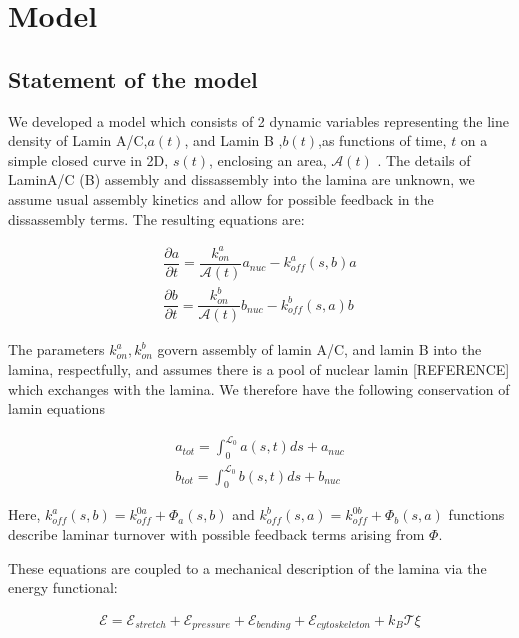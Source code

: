 \section{Model}

\subsection{Statement of the model} We developed a model which consists of 2 dynamic variables representing the line density of Lamin A/C,$a(t)$, and Lamin B ,$b(t)$,as functions of time, $t$ on a simple closed curve in 2D, $s(t)$, enclosing an area, $\mathcal{A}(t)$ . The details of LaminA/C (B)  assembly and dissassembly into the lamina are unknown, we assume usual assembly kinetics and allow for possible feedback in the dissassembly terms. The resulting equations are:

\begin{align}
\dfrac{\partial a}{\partial t} = \dfrac{k_{on}^a}{\mathcal{A}(t)} a_{nuc} - k_{off}^a (s,b)a\\[7pt]
\dfrac{\partial b}{\partial t} = \dfrac{k_{on}^b}{\mathcal{A}(t)}b_{nuc} - k_{off}^b  (s,a)b \label{eq::laminaKinetics}
\end{align}

The parameters $k_{on}^a , k_{on}^b$  govern assembly of lamin A/C, and lamin B into the lamina, respectfully, and assumes there is a pool of nuclear lamin [REFERENCE] which exchanges with the lamina. We therefore have the following conservation of lamin equations

\begin{align}
a_{tot}= \int_0^{\mathcal{L}_0} a(s,t) ds + a_{nuc}\\
b_{tot} = \int_0^{\mathcal{L}_0} b(s,t) ds + b_{nuc}
\end{align}

Here, $k_{off}^a (s,b) = k_{off}^{0a} + \Phi_a(s,b)$ and $ k_{off}^b(s,a)  = k_{off}^{0b} + \Phi_b(s,a)$ functions describe laminar turnover with possible feedback terms arising from $\Phi$.

These equations are coupled to a mechanical description of the lamina via the energy functional:


\begin{align}
\mathcal{E} = \mathcal{E}_{stretch} + \mathcal{E}_{pressure} +\mathcal{E}_{bending} + \mathcal{E}_{cytoskeleton} + k_B\mathcal{T} \xi
\end{align}

